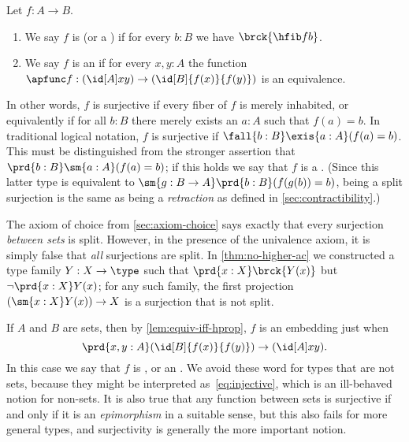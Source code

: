 \begin{defn}\label{defn:surj-emb}
  Let $f:A\to B$.
  \begin{enumerate}
  \item We say $f$ is 
    (or a )
    if for every $b:B$ we have $\brck{\hfib f b}$.
  \item We say $f$ is an 
    if for every $x,y:A$ the function $\apfunc f : (\id[A]xy) \to (\id[B]{f(x)}{f(y)})$ is an equivalence.
  \end{enumerate}
\end{defn}

In other words, $f$ is surjective if every fiber of $f$ is merely inhabited, or equivalently if for all $b:B$ there merely exists an $a:A$ such that $f(a)=b$.
In traditional logical notation, $f$ is surjective if $\fall{b:B}\exis{a:A} (f(a)=b)$.
This must be distinguished from the stronger assertion that $\prd{b:B}\sm{a:A} (f(a)=b)$; if this holds we say that $f$ is a .
%
%
%
%
(Since this latter type is equivalent to $\sm{g:B\to A}\prd{b:B} (f(g(b))=b)$, being a split surjection is the same as being a \emph{retraction} as defined in \cref{sec:contractibility}.)
%
%

The axiom of choice from \cref{sec:axiom-choice} says exactly that every surjection \emph{between sets} is split.
However, in the presence of the univalence axiom, it is simply false that \emph{all} surjections are split.
In \cref{thm:no-higher-ac} we constructed a type family $Y:X\to \type$ such that $\prd{x:X} \brck{Y(x)}$ but $\neg \prd{x:X} Y(x)$;
for any such family, the first projection $(\sm{x:X} Y(x)) \to X$ is a surjection that is not split.

If $A$ and $B$ are sets, then by \cref{lem:equiv-iff-hprop}, $f$ is an embedding just when
\begin{equation}
  \prd{x,y:A} (\id[B]{f(x)}{f(y)}) \to (\id[A]xy).\label{eq:injective}
\end{equation}
In this case we say that $f$ is ,
%
%
or an .
%
We avoid these word for types that are not sets, because they might be interpreted as~\eqref{eq:injective}, which is an ill-behaved notion for non-sets.
It is also true that any function between sets is surjective if and only if it is an \emph{epimorphism} in a suitable sense, but this also fails for more general types, and surjectivity is generally the more important notion.

